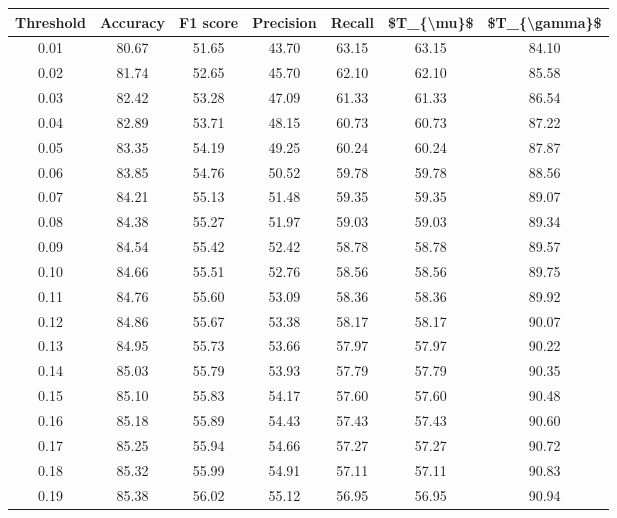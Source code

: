 \begin{tabular}{|c|c|c|c|c|c|c|}
\hline
 Threshold &  Accuracy &  F1 score &  Precision &  Recall &  \$T\_\{\textbackslash mu\}\$ &  \$T\_\{\textbackslash gamma\}\$ \\
\hline
      0.01 &     80.67 &     51.65 &      43.70 &   63.15 &      63.15 &         84.10 \\
      0.02 &     81.74 &     52.65 &      45.70 &   62.10 &      62.10 &         85.58 \\
      0.03 &     82.42 &     53.28 &      47.09 &   61.33 &      61.33 &         86.54 \\
      0.04 &     82.89 &     53.71 &      48.15 &   60.73 &      60.73 &         87.22 \\
      0.05 &     83.35 &     54.19 &      49.25 &   60.24 &      60.24 &         87.87 \\
      0.06 &     83.85 &     54.76 &      50.52 &   59.78 &      59.78 &         88.56 \\
      0.07 &     84.21 &     55.13 &      51.48 &   59.35 &      59.35 &         89.07 \\
      0.08 &     84.38 &     55.27 &      51.97 &   59.03 &      59.03 &         89.34 \\
      0.09 &     84.54 &     55.42 &      52.42 &   58.78 &      58.78 &         89.57 \\
      0.10 &     84.66 &     55.51 &      52.76 &   58.56 &      58.56 &         89.75 \\
      0.11 &     84.76 &     55.60 &      53.09 &   58.36 &      58.36 &         89.92 \\
      0.12 &     84.86 &     55.67 &      53.38 &   58.17 &      58.17 &         90.07 \\
      0.13 &     84.95 &     55.73 &      53.66 &   57.97 &      57.97 &         90.22 \\
      0.14 &     85.03 &     55.79 &      53.93 &   57.79 &      57.79 &         90.35 \\
      0.15 &     85.10 &     55.83 &      54.17 &   57.60 &      57.60 &         90.48 \\
      0.16 &     85.18 &     55.89 &      54.43 &   57.43 &      57.43 &         90.60 \\
      0.17 &     85.25 &     55.94 &      54.66 &   57.27 &      57.27 &         90.72 \\
      0.18 &     85.32 &     55.99 &      54.91 &   57.11 &      57.11 &         90.83 \\
      0.19 &     85.38 &     56.02 &      55.12 &   56.95 &      56.95 &         90.94 \\

\end{tabular}
